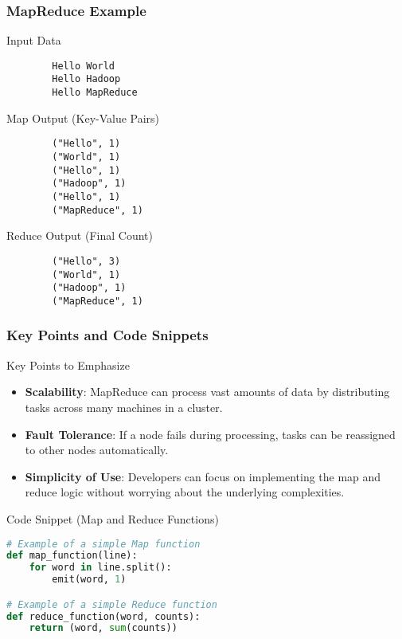 \documentclass[aspectratio=169]{beamer}
\begin{document}
\begin{frame}[fragile]
    \frametitle{MapReduce Example}
    \begin{block}{Input Data}
        \begin{verbatim}
        Hello World
        Hello Hadoop
        Hello MapReduce
        \end{verbatim}
    \end{block}

    \begin{block}{Map Output (Key-Value Pairs)}
        \begin{verbatim}
        ("Hello", 1)
        ("World", 1)
        ("Hello", 1)
        ("Hadoop", 1)
        ("Hello", 1)
        ("MapReduce", 1)
        \end{verbatim}
    \end{block}

    \begin{block}{Reduce Output (Final Count)}
        \begin{verbatim}
        ("Hello", 3)
        ("World", 1)
        ("Hadoop", 1)
        ("MapReduce", 1)
        \end{verbatim}
    \end{block}
\end{frame}

\begin{frame}[fragile]
    \frametitle{Key Points and Code Snippets}
    \begin{block}{Key Points to Emphasize}
        \begin{itemize}
            \item \textbf{Scalability}: MapReduce can process vast amounts of data by distributing tasks across many machines in a cluster.
            \item \textbf{Fault Tolerance}: If a node fails during processing, tasks can be reassigned to other nodes automatically.
            \item \textbf{Simplicity of Use}: Developers can focus on implementing the map and reduce logic without worrying about the underlying complexities.
        \end{itemize}
    \end{block}

    \begin{block}{Code Snippet (Map and Reduce Functions)}
        \begin{lstlisting}[language=Python]
# Example of a simple Map function
def map_function(line):
    for word in line.split():
        emit(word, 1)

# Example of a simple Reduce function
def reduce_function(word, counts):
    return (word, sum(counts))
        \end{lstlisting}
    \end{block}
\end{frame}
\end{document}
